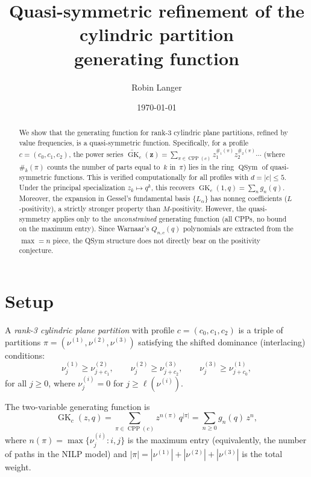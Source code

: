 \documentclass[11pt]{article}
\title{Quasi-symmetric refinement of the cylindric partition\\
generating function}
\author{Robin Langer}
\date{\today}
\newcommand{\CPP}{\operatorname{CPP}}
\newcommand{\GK}{\operatorname{GK}}
\newcommand{\QSym}{\operatorname{QSym}}
\begin{document}
\maketitle

\begin{abstract}
We show that the generating function for rank-3 cylindric plane
partitions, refined by value frequencies, is a quasi-symmetric
function. Specifically, for a profile $c = (c_0, c_1, c_2)$,
the power series
$\widetilde{\GK}_c(\mathbf{z}) = \sum_{\pi \in \CPP(c)}
z_1^{\#_1(\pi)} z_2^{\#_2(\pi)} \cdots$
(where $\#_k(\pi)$ counts the number of parts equal to~$k$ in~$\pi$)
lies in the ring $\QSym$ of quasi-symmetric functions.
This is verified computationally for all profiles with
$d = |c| \leq 5$. Under the principal specialization
$z_k \mapsto q^k$, this recovers
$\GK_c(1, q) = \sum_n g_n(q)$.
Moreover, the expansion in Gessel's fundamental basis
$\{L_\alpha\}$ has nonneg coefficients ($L$-positivity),
a strictly stronger property than $M$-positivity.
However, the quasi-symmetry applies only to the
\emph{unconstrained} generating function (all CPPs, no
bound on the maximum entry). Since Warnaar's
$Q_{n,c}(q)$ polynomials are extracted from the
$\max = n$ piece, the QSym structure does not directly
bear on the positivity conjecture.
\end{abstract}

\section{Setup}
\label{sec:setup}

A \emph{rank-3 cylindric plane partition} with profile
$c = (c_0, c_1, c_2)$ is a triple of partitions
$\pi = (\nu^{(1)}, \nu^{(2)}, \nu^{(3)})$ satisfying the
shifted dominance (interlacing) conditions:
\begin{equation}\label{eq:interlacing}
  \nu^{(1)}_j \geq \nu^{(2)}_{j+c_1}, \qquad
  \nu^{(2)}_j \geq \nu^{(3)}_{j+c_2}, \qquad
  \nu^{(3)}_j \geq \nu^{(1)}_{j+c_0},
\end{equation}
for all $j \geq 0$, where $\nu^{(i)}_j = 0$ for
$j \geq \ell(\nu^{(i)})$.

The two-variable generating function is
\[
  \GK_c(z, q)
  = \sum_{\pi \in \CPP(c)} z^{n(\pi)}\, q^{|\pi|}
  = \sum_{n \geq 0} g_n(q)\, z^n,
\]
where $n(\pi) = \max\{\nu^{(i)}_j : i, j\}$ is the maximum entry
(equivalently, the number of paths in the NILP model) and
$|\pi| = |\nu^{(1)}| + |\nu^{(2)}| + |\nu^{(3)}|$ is the total weight.
\end{document}
